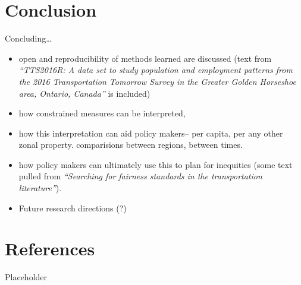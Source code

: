 \documentclass[
11pt, %
oneside, %
english, %
singlespacing, %
]{macthesis} %
\def\tightlist{}
\begin{document}
\chapter*{Conclusion}\label{conclusion}

Concluding\ldots{}

\begin{itemize}
\tightlist
\item
  open and reproducibility of methods learned are discussed (text from \emph{``TTS2016R: A data set to study population and employment patterns from the 2016 Transportation Tomorrow Survey in the Greater Golden Horseshoe area, Ontario, Canada''} is included)
\item
  how constrained measures can be interpreted,
\item
  how this interpretation can aid policy makers-- per capita, per any other zonal property. comparisions between regions, between times.
\item
  how policy makers can ultimately use this to plan for inequities (some text pulled from \emph{``Searching for fairness standards in the transportation literature''}).
\item
  Future research directions (?)
\end{itemize}

\chapter*{References}\label{references}

Placeholder
\end{document}
